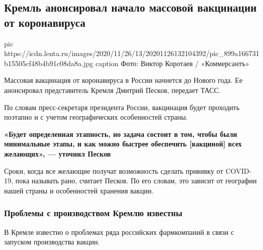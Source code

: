  
 
 
 
 
 
\subsection{Кремль анонсировал начало массовой вакцинации от коронавируса}
\label{sec:26_11_2020.news.ru.lenta_ru.1.mass_covid_vaccination}


\ifcmt
pic https://icdn.lenta.ru/images/2020/11/26/13/20201126132104392/pic_899a166731b15505cf48b4b91c08da8a.jpg
caption Фото: Виктор Коротаев / «Коммерсантъ»
\fi

Массовая вакцинация от коронавируса в России начнется до Нового года. Ее
анонсировал представитель Кремля Дмитрий Песков, передает ТАСС.

По словам пресс-секретаря президента России, вакцинация будет проходить
поэтапно и с учетом географических особенностей страны.

\begin{leftbar}
	\bfseries
	«Будет определенная этапность, но задача состоит в том, чтобы были
				минимальные этапы, и как можно быстрее обеспечить [вакциной] всех
				желающих», --- уточнил Песков
\end{leftbar}

Сроки, когда все желающие получат возможность сделать прививку от COVID-19,
пока называть рано, считает Песков. По его словам, это зависит от географии
нашей страны и особенностей хранения вакцин.  

\subsubsection{Проблемы с производством Кремлю известны}

В Кремле известно о проблемах ряда российских фармкомпаний в связи с запуском
производства вакцин.

